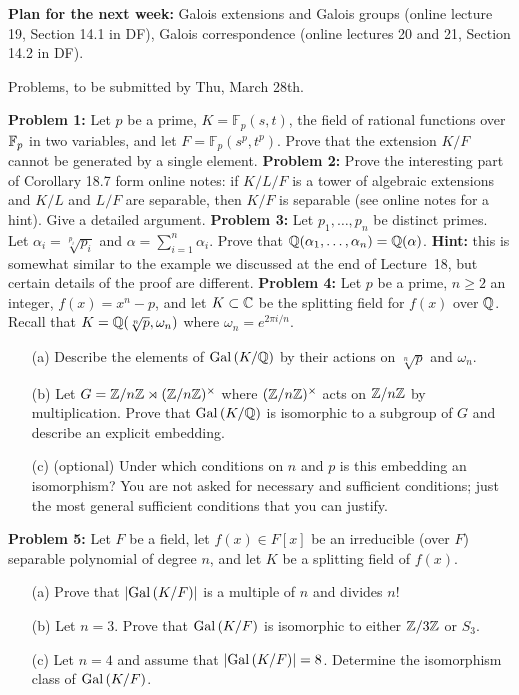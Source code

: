 \documentclass[12pt]{article}
\begin{document}
{\bf Plan for the next week:} Galois extensions and Galois groups (online lecture 19, Section 14.1 in DF), Galois correspondence (online lectures 20 and 21, Section 14.2 in DF).
\skv
\bf\centerline{Problems, to be submitted by Thu, March 28th. }\rm
\skv
{\bf Problem 1:} \rm Let $p$ be a prime, $K=\mathbb F_p(s,t)$, the field of rational functions over ${\mathbb F}_p$ in two variables, and
let $F=\mathbb F_p(s^p,t^p)$. Prove that the extension $K/F$ cannot be generated by a single element.
\skv
{\bf Problem 2:} \rm
Prove the interesting part of Corollary 18.7 form online notes: if $K/L/F$ is a tower of algebraic extensions and $K/L$ and $L/F$ are separable, then $K/F$ is separable (see online notes for a hint). Give a detailed argument.
\skv
{\bf Problem 3:} \rm Let $p_1,\ldots, p_n$ be distinct primes. Let $\alpha_i=\sqrt[p_i]{p_i}$ and $\alpha=\sum\limits_{i=1}^n \alpha_i$. Prove that ${\mathbb Q}(\alpha_1,\ldots,\alpha_n)={\mathbb Q}(\alpha)$. {\bf Hint:} this is somewhat similar to the example we discussed at the end of Lecture~18, but certain details of the proof are different.
\skv
{\bf Problem 4:} \rm  Let $p$ be a prime, $n\geq 2$ an integer, $f(x)=x^n-p$, and let
$K\subset {\mathbb C}$ be the splitting field for $f(x)$ over ${\mathbb Q}$.
Recall that $K={\mathbb Q}(\sqrt[n]{p},\omega_n)$ where
$\omega_n=e^{2\pi i/n}$.
\begin{itemize}
\item[(a)] Describe the elements of ${\rm Gal\,}(K/{\mathbb Q})$ by their actions on $\sqrt[n]{p}$
and $\omega_n$.
\item[(b)] Let $G={\mathbb Z}/n{\mathbb Z}\rtimes ({\mathbb Z}/n{\mathbb Z})^{\times}$ where 
$({\mathbb Z}/n{\mathbb Z})^{\times}$
acts on ${\mathbb Z}/n{\mathbb Z}$ by multiplication. Prove that ${\rm Gal\,}(K/{\mathbb Q})$ is isomorphic
to a subgroup of $G$ and describe an explicit embedding. 
\item[(c)] (optional) Under which conditions on $n$ and $p$ is this embedding an isomorphism? 
You are not asked for necessary and sufficient conditions; just the most general sufficient
conditions that you can justify.
\end{itemize}

{\bf Problem 5:} \rm Let $F$ be a field, let $f(x)\in F[x]$
be an irreducible (over $F$) separable polynomial of degree $n$,
and let $K$ be a splitting field of $f(x)$.

\begin{itemize}
\item[(a)] Prove that $|{\rm Gal\,}(K/F)|$ is a multiple of $n$ and divides $n!$

\item[(b)] Let $n=3$. Prove that ${\rm Gal\,}(K/F)$ is isomorphic to either ${\mathbb Z}/3{\mathbb Z}$ or $S_3$.

\item[(c)] Let $n=4$ and assume that $|{\rm Gal\,}(K/F)|=8$.
Determine the isomorphism class of ${\rm Gal\,}(K/F)$.
\end{itemize}
\end{document}
